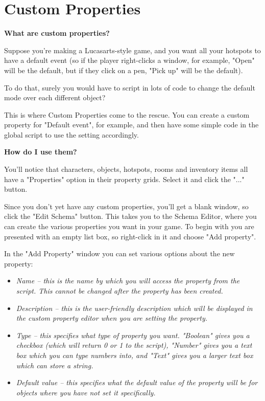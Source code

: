 \section{Custom Properties}%

\bf{What are custom properties?}

Suppose you're making a Lucasarts-style game, and you want all your hotspots to have
a default event (so if the player right-clicks a window, for example, "Open" will be
the default, but if they click on a pen, "Pick up" will be the default).

To do that, surely you would have to script in lots of code to change the default mode
over each different object?

This is where Custom Properties come to the rescue. You can create a custom property
for "Default event", for example, and then have some simple code in the global script
to use the setting accordingly.

\bf{How do I use them?}

You'll notice that characters, objects, hotspots, rooms and inventory items all have
a "Properties" option in their property grids. Select it and click the "..." button.

Since you don't yet have any custom properties, you'll get a blank window, so
click the "Edit Schema" button. This takes you to the Schema Editor, where you
can create the various properties you want in your game. To begin with you are
presented with an empty list box, so right-click in it and choose "Add property".

In the "Add Property" window you can set various options about the new property:
\begin{itemize}
\item \it{Name} -- this is the name by which you will access the property from the script.
This cannot be changed after the property has been created.
\item \it{Description} -- this is the user-friendly description which will be displayed
in the custom property editor when you are setting the property.
\item \it{Type} -- this specifies what type of property you want. "Boolean" gives you
a checkbox (which will return 0 or 1 to the script), "Number" gives you a text box which
you can type numbers into, and "Text" gives you a larger text box which can store a string.
\item \it{Default value} -- this specifies what the default value of the property will be
for objects where you have not set it specifically.
\end{itemize}

